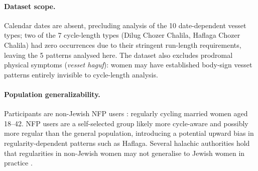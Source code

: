\documentclass[12pt]{article}
\begin{document}
\paragraph{Dataset scope.}
Calendar dates are absent, precluding analysis of the 10 date-dependent vesset types;
two of the 7 cycle-length types (Dilug Chozer Chalila, Haflaga Chozer Chalila) had
zero occurrences due to their stringent run-length requirements, leaving the 5
patterns analysed here. The dataset also excludes prodromal physical symptoms
(\textit{vesset haguf}): women may have established body-sign vesset patterns
entirely invisible to cycle-length analysis.

\paragraph{Population generalizability.}
Participants are non-Jewish NFP users \cite{fehring2013}: regularly cycling married
women aged 18--42. NFP users are a self-selected group likely more cycle-aware and
possibly more regular than the general population, introducing a potential upward bias
in regularity-dependent patterns such as Haflaga. Several halachic authorities hold
that regularities in non-Jewish women may not generalise to Jewish women in practice
\cite{anon2022phd}.
\end{document}
